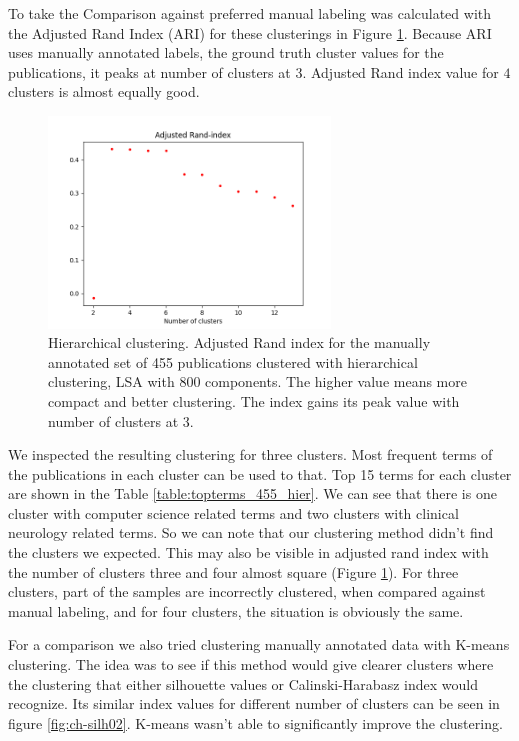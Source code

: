 To take the Comparison against preferred manual labeling was calculated with 
the Adjusted Rand Index (ARI) for these clusterings in Figure 
\ref{fig:ari01}. Because ARI uses manually annotated labels, the 
ground truth cluster values for the publications, it peaks at 
number of clusters at $3$. Adjusted Rand index value for $4$ 
clusters is almost equally good.
\begin{figure}[htp]
  \begin{center}    
\includegraphics[width=7.5cm]{images/ari-plot-455-2_12-800-hierarchical.png}
    \caption{Hierarchical clustering. Adjusted Rand index for the
    manually annotated set of 455 publications clustered with hierarchical
    clustering, LSA with 800 components. The higher value means
    more compact and better clustering. The index gains its peak value with 
    number of clusters at $3$.}
    \label{fig:ari01}
  \end{center}
\end{figure}

We inspected the resulting clustering for three clusters. Most
frequent terms of the publications in each cluster can be used to 
that. Top 15 terms for each cluster are shown in the Table 
\ref{table:topterms_455_hier}. We can see that there is one cluster
with computer science related terms and two clusters with clinical
neurology related terms. So we can note that our clustering method
didn't find the clusters we expected. This may also be visible 
in adjusted rand index with the number of clusters three and four almost
square (Figure \ref{fig:ari01}). For three clusters, part of the 
samples are incorrectly clustered, when compared against manual
labeling, and for four clusters, the situation is obviously the same.



For a comparison we also tried clustering manually annotated data
with K-means clustering. The idea was to see if this method would
give clearer clusters where the clustering that either silhouette values or 
Calinski-Harabasz index would recognize. Its similar
index values for different number of clusters can be seen in 
figure \ref{fig:ch-silh02}. K-means wasn't able to significantly 
improve the clustering.

